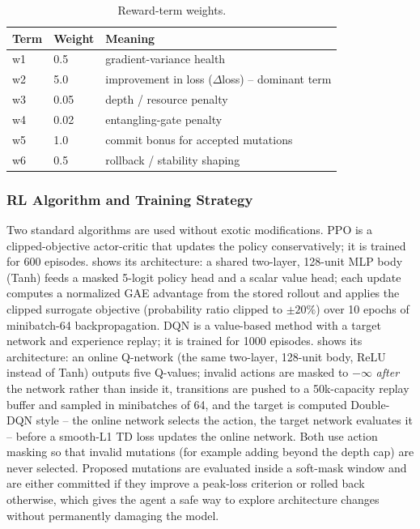 \begin{table}[htbp]
\centering
\caption{Reward-term weights.}
\label{tab:reward}
\begin{tabular}{|p{1.5cm}|p{1.8cm}|p{9.5cm}|}
\hline
\textbf{Term} & \textbf{Weight} & \textbf{Meaning} \\
\hline
w1 & 0.5 & gradient-variance health \\
w2 & 5.0 & improvement in loss ($\Delta$loss) -- dominant term \\
w3 & 0.05 & depth / resource penalty \\
w4 & 0.02 & entangling-gate penalty \\
w5 & 1.0 & commit bonus for accepted mutations \\
w6 & 0.5 & rollback / stability shaping \\
\hline
\end{tabular}
\end{table}

\subsubsection{RL Algorithm and Training Strategy}
Two standard algorithms are used without exotic modifications. PPO \citep{schulman2017proximal} is a clipped-objective actor-critic that updates the policy conservatively; it is trained for 600 episodes.  shows its architecture: a shared two-layer, 128-unit MLP body (Tanh) feeds a masked 5-logit policy head and a scalar value head; each update computes a normalized GAE advantage from the stored rollout and applies the clipped surrogate objective (probability ratio clipped to $\pm20\%$) over 10 epochs of minibatch-64 backpropagation. DQN \citep{mnih2015human} is a value-based method with a target network and experience replay; it is trained for 1000 episodes.  shows its architecture: an online Q-network (the same two-layer, 128-unit body, ReLU instead of Tanh) outputs five Q-values; invalid actions are masked to $-\infty$ \emph{after} the network rather than inside it, transitions are pushed to a 50k-capacity replay buffer and sampled in minibatches of 64, and the target is computed Double-DQN style -- the online network selects the action, the target network evaluates it -- before a smooth-L1 TD loss updates the online network. Both use action masking so that invalid mutations (for example adding beyond the depth cap) are never selected. Proposed mutations are evaluated inside a soft-mask window and are either committed if they improve a peak-loss criterion or rolled back otherwise, which gives the agent a safe way to explore architecture changes without permanently damaging the model.

